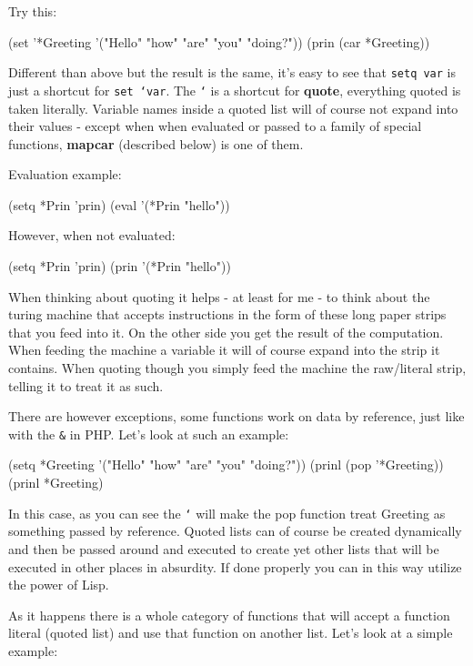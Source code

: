 Try this:

\begin{wideverbatim}
(set '*Greeting '("Hello" "how" "are" "you" "doing?"))
(prin (car *Greeting))
\end{wideverbatim}

Different than above but the result is the same, it's easy to see that
\texttt{setq var} is just a shortcut for \texttt{set ‘var}. The
\texttt{‘} is a shortcut for \textbf{quote}, everything quoted is
taken literally. Variable names inside a quoted list will of course
not expand into their values - except when when evaluated or passed to
a family of special functions, \textbf{mapcar} (described below) is
one of them.

Evaluation example:

\begin{wideverbatim}
(setq *Prin 'prin)
(eval '(*Prin "hello"))
\end{wideverbatim}

However, when not evaluated:

\begin{wideverbatim}
(setq *Prin 'prin)
(prin '(*Prin "hello"))
\end{wideverbatim}

When thinking about quoting it helps - at least for me - to think about
the turing machine that accepts instructions in the form of these long
paper strips that you feed into it. On the other side you get the result
of the computation. When feeding the machine a variable it will of
course expand into the strip it contains. When quoting though you simply
feed the machine the raw/literal strip, telling it to treat it as such.

There are however exceptions, some functions work on data by reference,
just like with the \texttt{\&} in PHP. Let's look at such an example:

\begin{wideverbatim}
(setq *Greeting '("Hello" "how" "are" "you" "doing?"))
(prinl (pop '*Greeting))
(prinl *Greeting)
\end{wideverbatim}

In this case, as you can see the \texttt{‘} will make the pop function
treat Greeting as something passed by reference. Quoted lists can of
course be created dynamically and then be passed around and executed
to create yet other lists that will be executed in other places in
absurdity. If done properly you can in this way utilize the power of
Lisp.

As it happens there is a whole category of functions that will accept a
function literal (quoted list) and use that function on another list.
Let's look at a simple example:

